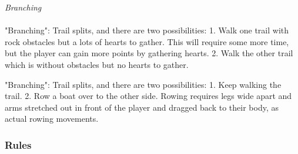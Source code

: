 \emph{Branching} \\ \\ 
"Branching": Trail splits, and there are two possibilities: 1. Walk one trail with rock obstacles but a lots of hearts to gather. This will require some more time, but the player can gain more points by gathering hearts. 2. Walk the other trail which is without obstacles but no hearts to gather. 

"Branching": Trail splits, and there are two possibilities: 1. Keep walking the trail. 2. Row a boat over to the other side. Rowing requires legs wide apart and arms stretched out in front of the player and dragged back to their body, as actual rowing movements. 

\subsubsection{Rules} 
 
